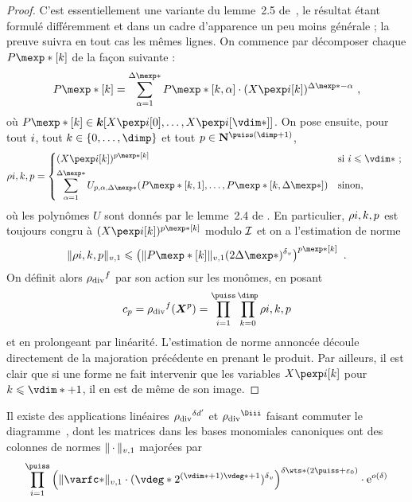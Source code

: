 \begin{proof}
  C'est essentiellement une variante du lemme~2.5 de~\cite{remivg}, le résultat
  étant formulé différemment et dans un cadre d'apparence un peu moins
  générale ; la preuve suivra en tout cas les mêmes lignes. On commence par
  décomposer chaque \( P\mexp*[\ind] \) de la façon suivante :
  \begin{equation}
    P\mexp*[\ind]
    =
    \sum _{\alpha=1}^{\Delta\mexp*}
    P\mexp*[\ind, \alpha] \cdot (\cmh\fct[\ind])^{\Delta\mexp* - \alpha}
    \pmm,
  \end{equation}
  où \( P\mexp*[\ind] \in \cdn [ \cmh\fct[0], \dots, \cmh\fct[\vdim*] ] \).
  On pose ensuite, pour tout \( i \), tout
  \( \ind \in \{ 0, \dots, \dimp \} \) et tout
  \( p \in \N^{\puiss(\dimp+1)} \),
  \begin{equation}
    \rho{\fct, \ind, p}
    =
    \begin{dcases*}
      ( \cmh\fct[\ind] ) ^{p\mexp*[\ind]}
      & si \( \fct \le \vdim* \) ;
      \\
      \sum _{\alpha=1}^{\Delta\mexp*}
      U_{p, \alpha, \Delta\mexp*}
      ( P\mexp*[\ind, 1], \dots, P\mexp*[\ind, \Delta\mexp*] )
      & sinon,
    \end{dcases*}
  \end{equation}
  où les polynômes \( U \) sont donnés par le lemme~2.4 de \cite{remivg}. En
  particulier, \( \rho{i, k, p} \) est toujours congru à
  \( ( \cmh\fct[\ind] ) ^{p\mexp*[\ind]} \) modulo \( \mathcal I \) et on a
  l'estimation de norme
  \begin{equation}
    \nv1{ \rho{\fct, \ind, p} }
    \le
    \left(
    \nv1{ P\mexp*[\ind] } (2\Delta\mexp*)^\dv
    \right) ^{p\mexp*[\ind]}
    \pmm.
  \end{equation}
  On définit alors \( { \rho_{\text{\normalfont div}} }^f \) par son action sur les monômes, en posant
  \begin{equation}
    c_p
    = \rdiv^f(\cmmh^p)
    = \prod\fctrange \prod\indrange \rho{\fct, \ind, p}
  \end{equation}
  et en prolongeant par linéarité. L'estimation de norme annoncée découle
  directement de la majoration précédente en prenant le produit. Par ailleurs,
  il est clair que si une forme ne fait intervenir que les variables \(
  \cmh\fct[\ind] \) pour \( \ind \le \vdim* + 1 \), il en est de même de son
  image.
\end{proof}

\begin{coro} \label{c:hmat-rdiv}
  Il existe des applications linéaires \( { \rho_{\text{\normalfont div}} }^{\delta d'} \) et \( \rdiv^\Diii \)
  faisant commuter le diagramme~, dont les matrices dans
  les bases monomiales canoniques ont des colonnes de normes \( \lVert{\,\cdot\,}\rVert_{v, 1} \)
  majorées par
  \begin{equation}
    \prod\fctrange \left(
    \nv1{ \varfc* }
    \cdot ( \vdeg* 2^{(\vdim*+1)\vdeg* + 1} )^\dv
    \right) ^{ \delta \wts* (2\puiss + \epsz) }
    \cdot \expb^{ o(\delta) }
  \end{equation}
\end{coro}


